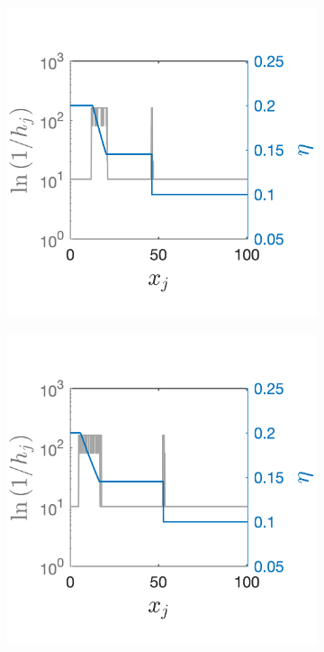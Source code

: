 \documentclass[final]{amsart}
\numberwithin{equation}{section}
\begin{document}
\begin{figure}[H]
\begin{subfigure}[b]{.25\textwidth}
	\caption{
		\label{fig_shw_dambreakSHW_dambreak_RK3_WENO3_rec_3_fixed_gs_stills_4001_adaptONOFF}
	}
\end{subfigure}
\begin{subfigure}[b]{.25\textwidth}
	\includegraphics[width=\textwidth]{../figures/fig_shw_dambreakSHW_dambreak_RK3_WENO3_rec_3_fixed_gs_stills_5001_adaptONOFF}	
	\caption{
		\label{fig_shw_dambreakSHW_dambreak_RK3_WENO3_rec_3_fixed_gs_stills_5001_adaptONOFF}
	}
\end{subfigure}
\begin{subfigure}[b]{.25\textwidth}
	\includegraphics[width=\textwidth]{../figures/fig_shw_dambreakSHW_dambreak_RK3_WENO3_rec_3_fixed_gs_stills_7001_adaptONOFF}	

\end{subfigure}
\end{figure}
\end{document}
